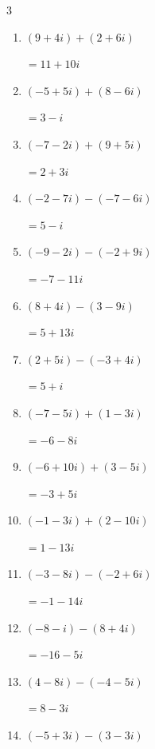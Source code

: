 \begin{multicols}{3}
\begin{enumerate}
        $\displaystyle =4+i$

  \item $\displaystyle (9+4i) + (2+6i)$

        $\displaystyle =11+10i$

  \item $\displaystyle (-5+5i) + (8-6i)$

        $\displaystyle =3-i$

  \item $\displaystyle (-7-2i) + (9+5i)$

        $\displaystyle =2+3i$

  \item $\displaystyle (-2-7i) - (-7-6i)$

        $\displaystyle =5-i$

  \item $\displaystyle (-9-2i) - (-2+9i)$

        $\displaystyle =-7-11i$

  \item $\displaystyle (8+4i) - (3-9i)$

        $\displaystyle =5+13i$

  \item $\displaystyle (2+5i) - (-3+4i)$

        $\displaystyle =5+i$

  \item $\displaystyle (-7-5i) + (1-3i)$

        $\displaystyle =-6-8i$

  \item $\displaystyle (-6+10i) + (3-5i)$

        $\displaystyle =-3+5i$

  \item $\displaystyle (-1-3i) + (2-10i)$

        $\displaystyle =1-13i$

  \item $\displaystyle (-3-8i) - (-2+6i)$

        $\displaystyle =-1-14i$

  \item $\displaystyle (-8-i) - (8+4i)$

        $\displaystyle =-16-5i$

  \item $\displaystyle (4-8i) - (-4-5i)$

        $\displaystyle =8-3i$

  \item $\displaystyle (-5+3i) - (3-3i)$


\end{enumerate}
\end{multicols}
